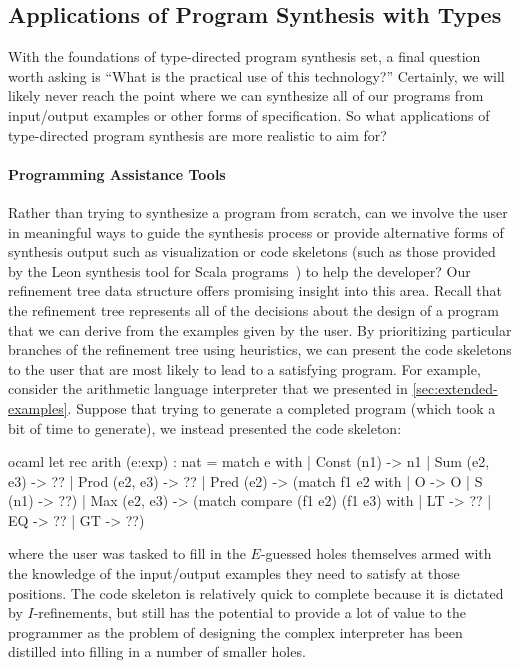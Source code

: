 \subsection{Applications of Program Synthesis with Types}
\label{subsec:applications-of-program-synthesis-with-types}

With the foundations of type-directed program synthesis set, a final question worth asking is ``What is the practical use of this technology?''
Certainly, we will likely never reach the point where we can synthesize all of our programs from input/output examples or other forms of specification.
So what applications of type-directed program synthesis are more realistic to aim for?

\paragraph{Programming Assistance Tools}
Rather than trying to synthesize a program from scratch, can we involve the user in meaningful ways to guide the synthesis process or provide alternative forms of synthesis output such as visualization or code skeletons (such as those provided by the Leon synthesis tool for Scala programs~\cite{kneuss-oopsla-2013}) to help the developer?
Our refinement tree data structure offers promising insight into this area.
Recall that the refinement tree represents all of the decisions about the design of a program that we can derive from the examples given by the user.
By prioritizing particular branches of the refinement tree using heuristics, we can present the code skeletons to the user that are most likely to lead to a satisfying program.
For example, consider the arithmetic language interpreter that we presented in \autoref{sec:extended-examples}.
Suppose that trying to generate a completed program (which took a bit of time to generate), we instead presented the code skeleton:
\begin{center}
  \begin{cminted}{ocaml}
let rec arith (e:exp) : nat =
  match e with
  | Const (n1) -> n1
  | Sum (e2, e3) -> ??
  | Prod (e2, e3) -> ??
  | Pred (e2) -> (match f1 e2 with
                 | O -> O
                 | S (n1) -> ??)
  | Max (e2, e3) -> (match compare (f1 e2) (f1 e3) with
                    | LT -> ??
                    | EQ -> ??
                    | GT -> ??)
  \end{cminted}
\end{center}
where the user was tasked to fill in the $E$-guessed holes themselves armed with the knowledge of the input/output examples they need to satisfy at those positions.
The code skeleton is relatively quick to complete because it is dictated by $I$-refinements, but still has the potential to provide a lot of value to the programmer as the problem of designing the complex interpreter has been distilled into filling in a number of smaller holes.


